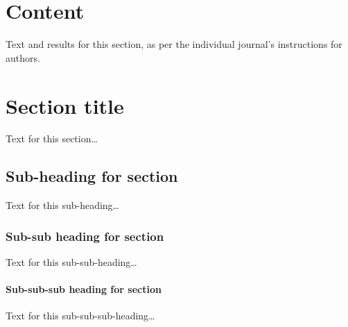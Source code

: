 \documentclass{bmcart}
\begin{document}


\section*{Content}
Text and results for this section, as per the individual journal's instructions for authors.

\section*{Section title}
Text for this section\ldots
\subsection*{Sub-heading for section}
Text for this sub-heading\ldots
\subsubsection*{Sub-sub heading for section}
Text for this sub-sub-heading\ldots
\paragraph*{Sub-sub-sub heading for section}
Text for this sub-sub-sub-heading\ldots
\end{document}
